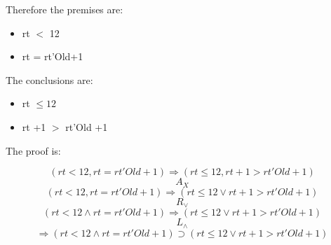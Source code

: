 Therefore the premises are: 
\begin{itemize}
	\item rt $<$ 12
	\item rt = rt'Old+1
\end{itemize}

The conclusions are:

\begin{itemize}
	\item rt $\leq{12}$ 
	\item  rt +1 $>$ rt'Old +1
\end{itemize}

The proof is:


\[
(rt < 12, rt = rt'Old+1) \Rightarrow{} (rt\leq{12}, rt+1 > rt'Old+1)
\]
\[
A_X
\]
\[
(rt < 12, rt = rt'Old+1) \Rightarrow{} (rt\leq{12} \lor{} rt+1 > rt'Old+1)
\]
\[
	R_\lor{}
\]
\[
(rt < 12 \land{} rt = rt'Old+1) \Rightarrow{} (rt\leq{12} \lor{} rt+1 > rt'Old+1)
\]
\[
	L_\land{}
\]
\[
\Rightarrow{} (rt < 12 \land{} rt = rt'Old+1) \supset{} (rt\leq{12} \lor{} rt+1 > rt'Old+1)
\]



